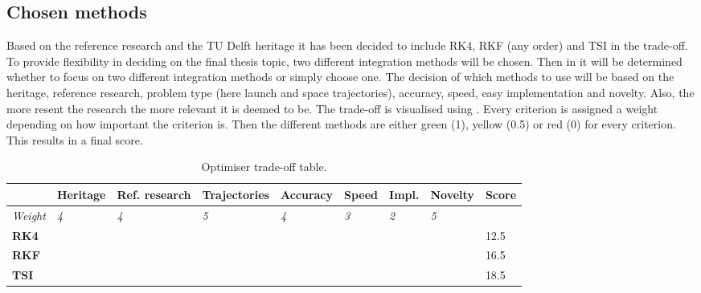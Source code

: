 \subsection{Chosen methods}
\label{subsec:chosintmeth}
Based on the reference research and the TU Delft heritage it has been decided to include \ac{RK4}, RKF (any order) and \ac{TSI} in the trade-off.
To provide flexibility in deciding on the final thesis topic, two different integration methods will be chosen. Then in  it will be determined whether to focus on two different integration methods or simply choose one. The decision of which methods to use will be based on the heritage, reference research, problem type (here launch and space trajectories), accuracy, speed, easy implementation and novelty. Also, the more resent the research the more relevant it is deemed to be. The trade-off is visualised using . Every criterion is assigned a weight depending on how important the criterion is. Then the different methods are either green (1), yellow (0.5) or red (0) for every criterion. This results in a final score. 


\begin{table}[!ht]
\begin{center}
\caption{Optimiser trade-off table.}
\label{tab:int_trade_off}
\begin{tabular}{|l||l|l|l|l|l|l|l||l|}
\hline 
 &	\textbf{Heritage} & \textbf{Ref. research} & \textbf{Trajectories} & \textbf{Accuracy} & \textbf{Speed} & \textbf{Impl.} & \textbf{Novelty} & \textbf{Score}\\ \hline 
\textit{Weight} & \textit{4} & \textit{4} & \textit{5} & \textit{4} & \textit{3}  & \textit{2} & \textit{5} & \\ \hline \hline
\textbf{\ac{RK4}} & \cellcolor{green} & \cellcolor{red} & \cellcolor{green} & \cellcolor{red} &  \cellcolor{yellow}  & \cellcolor{green} & \cellcolor{red} & 12.5 \\ \hline
\textbf{RKF} & \cellcolor{green} & \cellcolor{yellow} & \cellcolor{green} & \cellcolor{yellow} & \cellcolor{yellow}  & \cellcolor{green} & \cellcolor{red} &  16.5 \\ \hline
\textbf{\ac{TSI}} & \cellcolor{yellow} & \cellcolor{yellow} & \cellcolor{yellow} & \cellcolor{green} & \cellcolor{green}  & \cellcolor{red} & \cellcolor{green} & 18.5  \\ \hline


\end{tabular}
\end{center}
\end{table}


